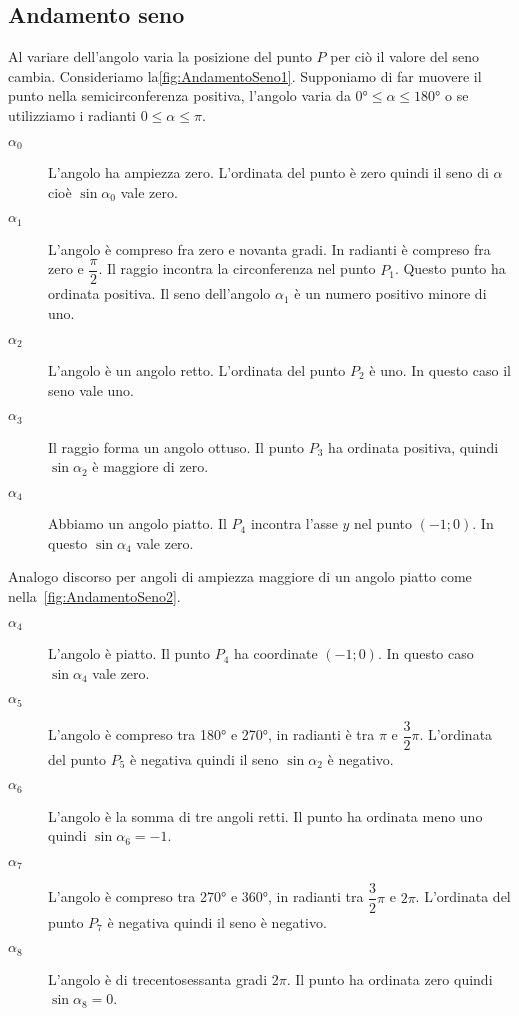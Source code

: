 \subsection{Andamento seno}
\label{subs:AndamentoSeno}
Al variare dell'angolo varia la posizione del punto $P$ per ciò il valore del seno cambia. Consideriamo la\nobs\vref{fig:AndamentoSeno1}. Supponiamo di far muovere il punto nella semicirconferenza positiva, l'angolo varia da  $\ang{0}\leq\alpha\leq\ang{180}$ o se utilizziamo i radianti $0\leq\alpha\leq\pi$. 
\begin{description}
	\item[$\alpha_0$] L'angolo ha ampiezza zero. L'ordinata del punto è zero quindi il seno di $\alpha$ cioè $\sin\alpha_0$ vale zero.
	\item [$\alpha_1$] L'angolo è compreso fra zero e novanta gradi. In radianti è compreso fra zero e $\dfrac{\pi}{2} $. Il raggio incontra la circonferenza nel punto $P_1$. Questo punto ha ordinata positiva. Il seno dell'angolo $\alpha_1$ è un numero positivo minore di uno.
	\item [$\alpha_2$] L'angolo è un angolo retto. L'ordinata del punto $P_2$ è uno. In questo caso il seno vale uno. 
	\item [$\alpha_3$] Il raggio forma un angolo ottuso. Il punto $P_3$ ha ordinata positiva, quindi $\sin\alpha_2$ è maggiore di zero.
	\item [$\alpha_4$] Abbiamo un  angolo piatto. Il $P_4$ incontra l'asse $y$ nel punto $(-1;0)$. In questo $\sin\alpha_4$ vale zero.
\end{description}
Analogo discorso per angoli di ampiezza maggiore di un angolo piatto come nella~\vref{fig:AndamentoSeno2}.
\begin{description}
	\item [$\alpha_4$] L'angolo è piatto. Il punto $P_4$ ha coordinate $(-1;0)$. In questo caso $\sin\alpha_4$ vale zero.
	\item [$\alpha_5$] L'angolo è compreso tra \ang{180} e \ang{270}, in radianti è tra $\pi$ e $\dfrac{3}{2}\pi$. L'ordinata del punto $P_5$ è negativa quindi il seno $\sin\alpha_2$ è negativo.
	\item [$\alpha_6$] L'angolo è la somma di tre angoli retti. Il punto ha ordinata meno uno quindi $\sin\alpha_6=-1$.
	\item [$\alpha_7$] L'angolo è compreso tra \ang{270} e \ang{360}, in radianti tra $\dfrac{3}{2}\pi$ e $2\pi$. L'ordinata del punto $P_7$ è negativa quindi il seno è negativo.
	\item [$\alpha_8$] L'angolo è di trecentosessanta gradi $2\pi$. Il punto ha ordinata zero quindi $\sin\alpha_8=0$.
\end{description}
